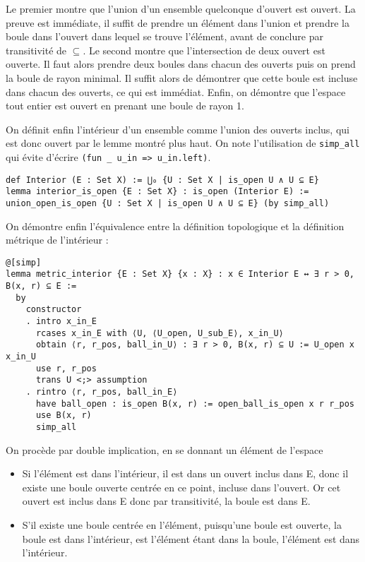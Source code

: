 \documentclass[a4paper, 12pt]{article}
\newcommand{\lean}[1]{\texttt{#1}}
\begin{document}
Le premier montre que l'union d'un ensemble quelconque d'ouvert est ouvert. La preuve est immédiate, il suffit de prendre un élément dans l'union et prendre la boule dans l'ouvert dans lequel se trouve l'élément, avant de conclure par transitivité de $\subseteq$. Le second montre que l'intersection de deux ouvert est ouverte. Il faut alors prendre deux boules dans chacun des ouverts puis on prend la boule de rayon minimal. Il suffit alors de démontrer que cette boule est incluse dans chacun des ouverts, ce qui est immédiat. Enfin, on démontre que l'espace tout entier est ouvert en prenant une boule de rayon 1.

On définit enfin l'intérieur d'un ensemble comme l'union des ouverts inclus, qui est donc ouvert par le lemme montré plus haut. On note l'utilisation de \lean{simp_all} qui évite d'écrire \lean{(fun _ u_in => u_in.left)}.

\begin{verbatim}
def Interior (E : Set X) := ⋃₀ {U : Set X | is_open U ∧ U ⊆ E}
lemma interior_is_open {E : Set X} : is_open (Interior E) := union_open_is_open {U : Set X | is_open U ∧ U ⊆ E} (by simp_all)
\end{verbatim}

On démontre enfin l'équivalence entre la définition topologique et la définition métrique de l'intérieur :

\begin{verbatim}
@[simp]
lemma metric_interior {E : Set X} {x : X} : x ∈ Interior E ↔ ∃ r > 0, B(x, r) ⊆ E :=
  by
    constructor
    . intro x_in_E
      rcases x_in_E with ⟨U, ⟨U_open, U_sub_E⟩, x_in_U⟩
      obtain ⟨r, r_pos, ball_in_U⟩ : ∃ r > 0, B(x, r) ⊆ U := U_open x x_in_U
      use r, r_pos
      trans U <;> assumption
    . rintro ⟨r, r_pos, ball_in_E⟩
      have ball_open : is_open B(x, r) := open_ball_is_open x r r_pos
      use B(x, r)
      simp_all
\end{verbatim}

On procède par double implication, en se donnant un élément de l'espace
\begin{itemize}
    \item Si l'élément est dans l'intérieur, il est dans un ouvert inclus dans E, donc il existe une boule ouverte centrée en ce point, incluse dans l'ouvert. Or cet ouvert est inclus dans E donc par transitivité, la boule est dans E.
    \item S'il existe une boule centrée en l'élément, puisqu'une boule est ouverte, la boule est dans l'intérieur, est l'élément étant dans la boule, l'élément est dans l'intérieur.
\end{itemize}
\end{document}
